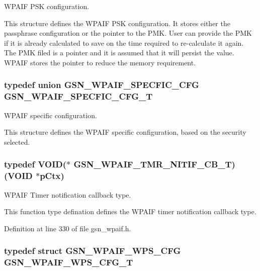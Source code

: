 WPAIF PSK configuration. 

This structure defines the WPAIF PSK configuration. It stores either the passphrase configuration or the pointer to the PMK. User can provide the PMK if it is already calculated to save on the time required to re-\/calculate it again. The PMK filed is a pointer and it is assumed that it will persist the value. WPAIF stores the pointer to reduce the memory requirement. \hypertarget{a00687_ga976816e9ade6b55dce10949691396249}{
\subsubsection[{GSN\_\-WPAIF\_\-SPECFIC\_\-CFG\_\-T}]{\setlength{\rightskip}{0pt plus 5cm}typedef union {\bf GSN\_\-WPAIF\_\-SPECFIC\_\-CFG} {\bf GSN\_\-WPAIF\_\-SPECFIC\_\-CFG\_\-T}}}
\label{a00687_ga976816e9ade6b55dce10949691396249}


WPAIF specific configuration. 

This structure defines the WPAIF specific configuration, based on the security selected. \hypertarget{a00687_ga84bfdf616b263689a81c060d1bdf224b}{
\subsubsection[{GSN\_\-WPAIF\_\-TMR\_\-NITIF\_\-CB\_\-T}]{\setlength{\rightskip}{0pt plus 5cm}typedef VOID($\ast$ {\bf GSN\_\-WPAIF\_\-TMR\_\-NITIF\_\-CB\_\-T})(VOID $\ast$pCtx)}}
\label{a00687_ga84bfdf616b263689a81c060d1bdf224b}


WPAIF Timer notification callback type. 

This function type defination defines the WPAIF timer notification callback type. 

Definition at line 330 of file gsn\_\-wpaif.h.

\hypertarget{a00687_gad51d45617a4ed8eff4b53f1196737959}{
\subsubsection[{GSN\_\-WPAIF\_\-WPS\_\-CFG\_\-T}]{\setlength{\rightskip}{0pt plus 5cm}typedef struct {\bf GSN\_\-WPAIF\_\-WPS\_\-CFG} {\bf GSN\_\-WPAIF\_\-WPS\_\-CFG\_\-T}}}
\label{a00687_gad51d45617a4ed8eff4b53f1196737959}


